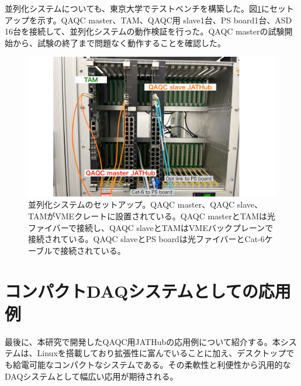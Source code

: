 並列化システムについても、東京大学でテストベンチを構築した。図\ref{QAQCpararellpicture}にセットアップを示す。QAQC master、TAM、QAQC用 slave1台、PS board1台、ASD 16台を接続して、並列化システムの動作検証を行った。QAQC masterの試験開始から、試験の終了まで問題なく動作することを確認した。


\begin{figure} 
\centering
\includegraphics[width=16cm]{fig/QAQC/QAQCpararellpicture.pdf}
\caption[並列化システムのセットアップ]{並列化システムのセットアップ。QAQC master、QAQC slave、TAMがVMEクレートに設置されている。QAQC masterとTAMは光ファイバーで接続し、QAQC slaveとTAMはVMEバックプレーンで接続されている。QAQC slaveとPS boardは光ファイバーとCat-6ケーブルで接続されている。}
\label{QAQCpararellpicture}
\end{figure}

\section{コンパクトDAQシステムとしての応用例}
\label{sec_compactdaq}
最後に、本研究で開発したQAQC用JATHubの応用例について紹介する。本システムは、Linuxを搭載しており拡張性に富んでいることに加え、デスクトップでも給電可能なコンパクトなシステムである。その柔軟性と利便性から汎用的なDAQシステムとして幅広い応用が期待される。

